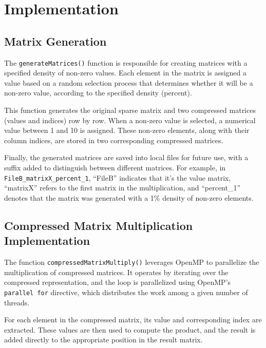 \documentclass[
]{article}
\begin{document}
\vspace{0.5cm}

\section{Implementation}\label{implementation}

\subsection{Matrix Generation}\label{matrix-generation}

The \texttt{generateMatrices()} function is responsible for creating
matrices with a specified density of non-zero values. Each element in
the matrix is assigned a value based on a random selection process that
determines whether it will be a non-zero value, according to the
specified density (percent).

This function generates the original sparse matrix and two compressed
matrices (values and indices) row by row. When a non-zero value is
selected, a numerical value between 1 and 10 is assigned. These non-zero
elements, along with their column indices, are stored in two
corresponding compressed matrices.

Finally, the generated matrices are saved into local files for future
use, with a suffix added to distinguish between different matrices. For
example, in \texttt{FileB\_matrixX\_percent\_1}, ``FileB'' indicates
that it's the value matrix, ``matrixX'' refers to the first matrix in
the multiplication, and ``percent\_1'' denotes that the matrix was
generated with a 1\% density of non-zero elements.

\subsection{Compressed Matrix Multiplication
Implementation}\label{compressed-matrix-multiplication-implementation}

The function \texttt{compressedMatrixMultiply()} leverages OpenMP to
parallelize the multiplication of compressed matrices. It operates by
iterating over the compressed representation, and the loop is
parallelized using OpenMP's \texttt{parallel\ for} directive, which
distributes the work among a given number of threads.

For each element in the compressed matrix, its value and corresponding
index are extracted. These values are then used to compute the product,
and the result is added directly to the appropriate position in the
result matrix.
\end{document}
